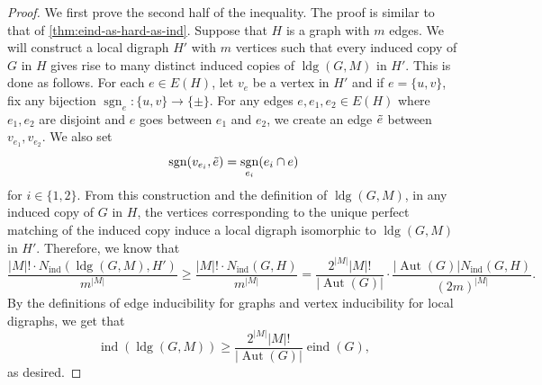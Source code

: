 \documentclass[10pt,a4paper]{amsart}
\DeclareMathOperator{\Aut}{Aut}
\DeclareMathOperator{\eind}{eind}
\DeclareMathOperator{\ind}{ind}
\DeclareMathOperator{\ldg}{ldg}
\DeclareMathOperator{\sgn}{sgn}
\newcommand{\abs}[1]{\left\lvert#1\right\rvert}
\begin{document}
\begin{proof}
    We first prove the second half of the inequality.
    The proof is similar to that of \cref{thm:eind-as-hard-as-ind}.
    Suppose that $H$ is a graph with $m$ edges.
    We will construct a local digraph $H'$ with $m$ vertices such that every induced copy of $G$ in $H$ gives rise to many distinct induced copies of $\ldg(G,M)$ in $H'$. This is done as follows.
    For each $e\in E(H)$, let $v_e$ be a vertex in $H'$ and if $e=\{u,v\}$, fix any bijection $\sgn_e\colon\{u,v\}\to \{\pm\}$.
    For any edges $e,e_1,e_2\in E(H)$ where $e_1,e_2$ are disjoint and $e$ goes between $e_1$ and $e_2$, we create an edge $\Tilde{e}$ between $v_{e_1},v_{e_2}$. 
    We also set
    \[\sgn(v_{e_i},\Tilde{e}) = \sgn_{e_i}(e_i\cap e)\]
    for $i\in\{1,2\}$.
     From this construction and the definition of $\ldg(G,M)$, in any induced copy of $G$ in $H$, the vertices corresponding to the unique perfect matching of the induced copy induce a local digraph isomorphic to $\ldg(G,M)$ in $H'$.
    Therefore, we know that 
    \[\frac{\abs{M}!\cdot N_{\ind}(\ldg(G,M),H')}{m^{\abs{M}}}\geq \frac{\abs{M}!\cdot N_{\ind}(G,H)}{m^{\abs{M}}}= \frac{2^{\abs{M}}\abs{M}!}{\abs{\Aut(G)}}\cdot\frac{ \abs{\Aut(G)}N_{\ind}(G,H)}{(2m)^{\abs{M}}}.\]
    By the definitions of edge inducibility for graphs and vertex inducibility for local digraphs, we get that
    \[\ind(\ldg(G,M))\geq  \frac{2^{\abs{M}}\abs{M}!}{\abs{\Aut(G)}}\eind(G),\]
    as desired.


\end{proof}
\end{document}
